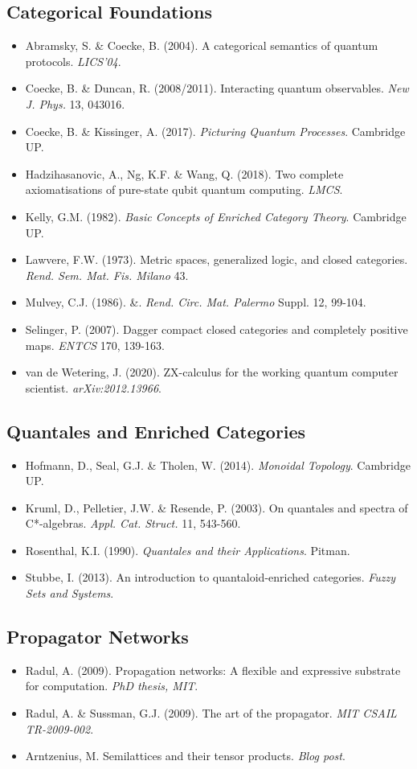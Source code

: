 \documentclass[11pt]{article}
\begin{document}
\subsection{Categorical Foundations}
\label{sec:org5e9171d}
\begin{itemize}
\item Abramsky, S. \& Coecke, B. (2004). A categorical semantics of quantum protocols. \emph{LICS'04}.
\item Coecke, B. \& Duncan, R. (2008/2011). Interacting quantum observables. \emph{New J. Phys.} 13, 043016.
\item Coecke, B. \& Kissinger, A. (2017). \emph{Picturing Quantum Processes}. Cambridge UP.
\item Hadzihasanovic, A., Ng, K.F. \& Wang, Q. (2018). Two complete axiomatisations of pure-state qubit quantum computing. \emph{LMCS}.
\item Kelly, G.M. (1982). \emph{Basic Concepts of Enriched Category Theory}. Cambridge UP.
\item Lawvere, F.W. (1973). Metric spaces, generalized logic, and closed categories. \emph{Rend. Sem. Mat. Fis. Milano} 43.
\item Mulvey, C.J. (1986). \&. \emph{Rend. Circ. Mat. Palermo} Suppl. 12, 99-104.
\item Selinger, P. (2007). Dagger compact closed categories and completely positive maps. \emph{ENTCS} 170, 139-163.
\item van de Wetering, J. (2020). ZX-calculus for the working quantum computer scientist. \emph{arXiv:2012.13966}.
\end{itemize}
\subsection{Quantales and Enriched Categories}
\label{sec:orgf46876a}
\begin{itemize}
\item Hofmann, D., Seal, G.J. \& Tholen, W. (2014). \emph{Monoidal Topology}. Cambridge UP.
\item Kruml, D., Pelletier, J.W. \& Resende, P. (2003). On quantales and spectra of C*-algebras. \emph{Appl. Cat. Struct.} 11, 543-560.
\item Rosenthal, K.I. (1990). \emph{Quantales and their Applications}. Pitman.
\item Stubbe, I. (2013). An introduction to quantaloid-enriched categories. \emph{Fuzzy Sets and Systems}.
\end{itemize}
\subsection{Propagator Networks}
\label{sec:org4a3177a}
\begin{itemize}
\item Radul, A. (2009). Propagation networks: A flexible and expressive substrate for computation. \emph{PhD thesis, MIT}.
\item Radul, A. \& Sussman, G.J. (2009). The art of the propagator. \emph{MIT CSAIL TR-2009-002}.
\item Arntzenius, M. Semilattices and their tensor products. \emph{Blog post}.
\end{itemize}
\end{document}
